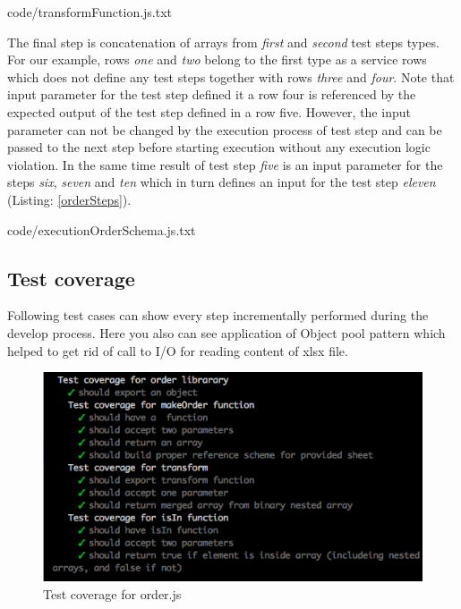 
{code/transformFunction.js.txt}

The final step is concatenation of arrays from \textit{first} and \textit{second} test steps types. For our example, rows \textit{one} and \textit{two} belong to the first type as a service rows which does not define any test steps together with rows \textit{three} and \textit{four}. Note that input parameter for the test step defined it a row four is referenced by the expected output of the test step defined in a row five. However, the input parameter can not be changed by the execution process of test step and can be passed to the next step before starting execution without any execution logic violation. In the same time result of test step \textit{five} is an input parameter for the steps \textit{six}, \textit{seven} and \textit{ten} which in turn defines an input for the test step \textit{eleven} (Listing: \ref{orderSteps}).

{code/executionOrderSchema.js.txt}


\subsection{Test coverage}

Following test cases can show every step incrementally performed during the develop process. Here you also can see application of Object pool pattern which helped to get rid of call to I/O for reading content of xlsx file.
\begin{figure}[H]
	\centering
	\includegraphics[width=\linewidth]{grafiken/testOrder.png}
	\caption{Test coverage for order.js}
	\label{fig:testOrder}
\end{figure}

